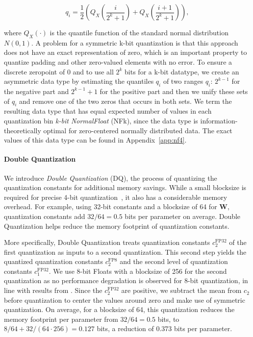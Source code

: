 \documentclass{article}
\newcommand{\Doublequant}{Double Quantization\xspace}
\begin{document}
\begin{equation}
q_i  = \frac{1}{2}\left( Q_X\left(\frac{i}{2^k+1}\right) + Q_X\left(\frac{i+1}{2^k+1}\right)\right),
\end{equation}

\noindent

where $Q_X(\cdot)$ is the quantile function of the standard normal distribution $N(0,1)$. A problem for a symmetric k-bit quantization is that this approach does not have an exact representation of zero, which is an important property to quantize padding and other zero-valued elements with no error. To ensure a discrete zeropoint of $0$ and to use all $2^k$ bits for a k-bit datatype, we create an asymmetric data type by estimating the quantiles $q_i$ of two ranges $q_i$: $2^{k-1}$ for the negative part and $2^{k-1}+1$ for the positive part and then we unify these sets of $q_i$ and remove one of the two zeros that occurs in both sets. We term the resulting data type that has equal expected number of values in each quantization bin \emph{k-bit NormalFloat} (NFk), since the data type is information-theoretically optimal for zero-centered normally distributed data. The exact values of this data type can be found in Appendix~\ref{app:nf4}.

\paragraph{\Doublequant{}} 
We introduce \emph{\Doublequant} (DQ), the process of quantizing the quantization constants for additional memory savings.
While a small blocksize is required for precise 4-bit quantization~\citep{dettmers2022case}, it also has a considerable memory overhead. For example, using 32-bit constants and a blocksize of 64 for $\mathbf{W}$, quantization constants add $32/64 = 0.5$ bits per parameter on average. \Doublequant helps reduce the memory footprint of quantization constants.


More specifically, \Doublequant treats quantization constants $c_2^{\text{FP32}}$ of the first quantization as inputs to a second quantization. This second step yields the quantized quantization constants $c_2^{\text{FP8}}$ and the second level of quantization constants $c_1^{\text{FP32}}$. We use 8-bit Floats with a blocksize of 256 for the second quantization as no performance degradation is observed for 8-bit quantization, in line with results from \citet{dettmers2022case}. 
Since the $c_2^{\text{FP32}}$ are positive, we subtract the mean from $c_2$ before quantization to center the values around zero and make use of symmetric quantization. On average, for a blocksize of 64, this quantization reduces the memory footprint per parameter from $32/64=0.5$ bits, to $8/64 + 32/(64\cdot256) = 0.127$ bits, a reduction of 0.373 bits per parameter. 
\end{document}
